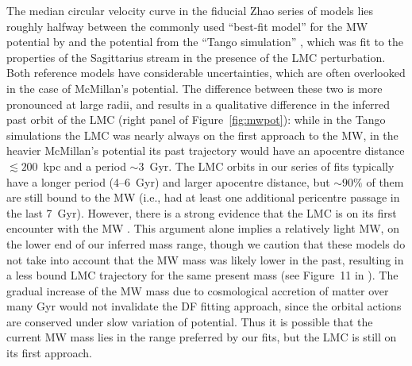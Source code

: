 \documentclass[usenatbib,fleqn]{mnras}
\begin{document}
The median circular velocity curve in the fiducial Zhao series of models lies roughly halfway between the commonly used ``best-fit model'' for the MW potential by \citet{McMillan2017} and the potential from the ``Tango simulation'' \citep{Vasiliev2021b}, which was fit to the properties of the Sagittarius stream in the presence of the LMC perturbation. Both reference models have considerable uncertainties, which are often overlooked in the case of McMillan's potential. The difference between these two is more pronounced at large radii, and results in a qualitative difference in the inferred past orbit of the LMC (right panel of Figure~\ref{fig:mwpot}): while in the Tango simulations the LMC was nearly always on the first approach to the MW, in the heavier McMillan's potential its past trajectory would have an apocentre distance $\lesssim 200$~kpc and a period $\sim 3$~Gyr. The LMC orbits in our series of fits typically have a longer period (4--6~Gyr) and larger apocentre distance, but $\sim 90\%$ of them are still bound to the MW (i.e., had at least one additional pericentre passage in the last 7~Gyr).
However, there is a strong evidence that the LMC is on its first encounter with the MW \citep[e.g.,][and references therein]{Kallivayalil2013}. This argument alone implies a relatively light MW, on the lower end of our inferred mass range, though we caution that these models do not take into account that the MW mass was likely lower in the past, resulting in a less bound LMC trajectory for the same present mass (see Figure~11 in \citealt{Kallivayalil2013}). The gradual increase of the MW mass due to cosmological accretion of matter over many Gyr would not invalidate the DF fitting approach, since the orbital actions are conserved under slow variation of potential. Thus it is possible that the current MW mass lies in the range preferred by our fits, but the LMC is still on its first approach.
\end{document}
